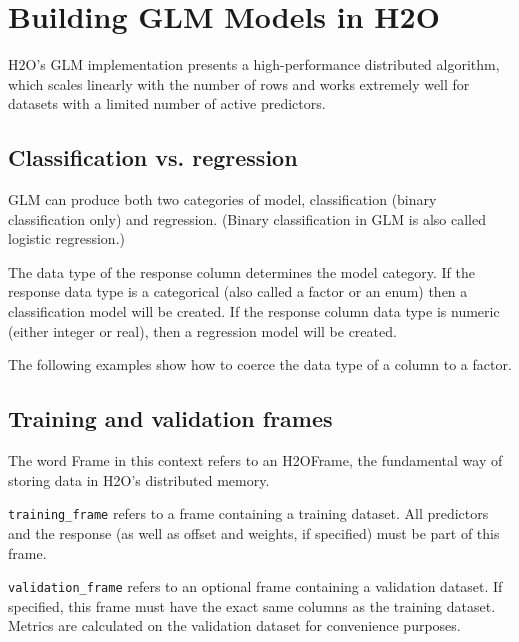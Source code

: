 
\section{Building GLM Models in H2O}

H2O's GLM implementation presents a high-performance distributed algorithm, which scales linearly with the number
of rows and works extremely well for datasets with a limited number of active predictors.

\subsection{Classification vs. regression}

GLM can produce both two categories of model, classification (binary classification only) and regression.  (Binary
classification in GLM is also called logistic regression.)

The data type of the response column determines the model category.  If the response data type is a categorical
(also called a factor or an enum) then a classification model will be created.  If the response column data type is
numeric (either integer or real), then a regression model will be created.

The following examples show how to coerce the data type of a column to a factor.

\bigskip
\waterExampleInR


\waterExampleInPython


\subsection{Training and validation frames}

The word Frame in this context refers to an H2OFrame, the fundamental way of storing data in H2O's distributed memory.

\texttt{training\_frame} refers to a frame containing a training dataset.  All predictors and the response (as
well as offset and weights, if specified) must be part of this frame.

\texttt{validation\_frame} refers to an optional frame containing a validation dataset.  If specified, this 
frame must have the exact same columns as the training dataset.  Metrics are calculated on the validation dataset
for convenience purposes.

